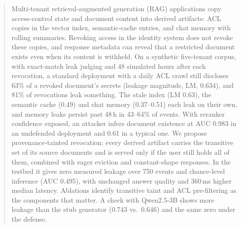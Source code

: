 \begin{abstract}
Multi-tenant retrieval-augmented generation (RAG) applications copy access-control state and document content into derived artifacts: ACL copies in the vector index, semantic-cache entries, and chat memory with rolling summaries. Revoking access in the identity system does not revoke these copies, and response metadata can reveal that a restricted document exists even when its content is withheld. On a synthetic five-tenant corpus, with exact-match leak judging and 48 simulated hours after each revocation, a standard deployment with a daily ACL crawl still discloses 63\% of a revoked document's secrets (leakage magnitude, LM, 0.634), and 81\% of revocations leak something. The stale index (LM 0.63), the semantic cache (0.49) and chat memory (0.37--0.51) each leak on their own, and memory leaks persist past 48\,h in 43--64\% of events. With reranker confidence exposed, an attacker infers document existence at AUC 0.983 in an undefended deployment and 0.61 in a typical one. We propose provenance-tainted revocation: every derived artifact carries the transitive set of its source documents and is served only if the user still holds all of them, combined with eager eviction and constant-shape responses. In the testbed it gives zero measured leakage over 750 events and chance-level inference (AUC 0.495), with unchanged answer quality and 360\,ms higher median latency. Ablations identify transitive taint and ACL pre-filtering as the components that matter. A check with Qwen2.5-3B shows more leakage than the stub generator (0.743 vs.\ 0.646) and the same zero under the defense.
\end{abstract}

